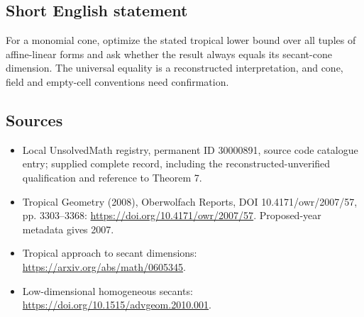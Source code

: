 \documentclass[11pt]{article}
\begin{document}
\subsection{Short English statement}
For a monomial cone, optimize the stated tropical lower bound over all tuples of affine-linear forms and ask whether the result always equals its secant-cone dimension. The universal equality is a reconstructed interpretation, and cone, field and empty-cell conventions need confirmation.
\subsection{Sources}
\begin{itemize}
\item Local UnsolvedMath registry, permanent ID 30000891, source code catalogue entry; supplied complete record, including the reconstructed-unverified qualification and reference to Theorem 7.
\item Tropical Geometry (2008), Oberwolfach Reports, DOI 10.4171/owr/2007/57, pp. 3303--3368: \url{https://doi.org/10.4171/owr/2007/57}. Proposed-year metadata gives 2007.
\item Tropical approach to secant dimensions: \url{https://arxiv.org/abs/math/0605345}.
\item Low-dimensional homogeneous secants: \url{https://doi.org/10.1515/advgeom.2010.001}.
\end{itemize}
\end{document}
